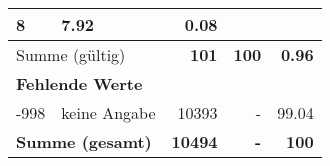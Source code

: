 \begin{longtable}{lXrrr}
       \num{8} &
       \num[round-mode=places,round-precision=2]{7.92} &
         \num[round-mode=places,round-precision=2]{0.08} \\
     \midrule
     \multicolumn{2}{l}{Summe (gültig)} &
       \textbf{\num{101}} &
     \textbf{\num{100}} &
       \textbf{\num[round-mode=places,round-precision=2]{0.96}} \\
     \multicolumn{5}{l}{\textbf{Fehlende Werte}}\\
       -998 &
       keine Angabe &
         \num{10393} &
        - &
         \num[round-mode=places,round-precision=2]{99.04} \\
     \midrule
     \multicolumn{2}{l}{\textbf{Summe (gesamt)}} &
          \textbf{\num{10494}} &
        \textbf{-} &
        \textbf{\num{100}} \\
     \bottomrule
     \end{longtable}
     
